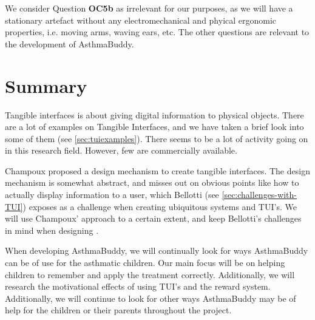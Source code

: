 We consider Question \textbf{OC5b} as irrelevant for our purposes, as we will have a stationary artefact without any electromechanical and phyical ergonomic properties, i.e. moving arms, waving ears, etc. The other questions are relevant to the development of AsthmaBuddy.



\section{Summary}
\label{sec:tangiblesummary}


Tangible interfaces is about giving digital information to physical objects. There are a lot of examples on Tangible Interfaces, and we have taken a brief look into some of them (see \ref{sec:tuiexamples}). There seems to be a lot of activity going on in this research field. However, few are commercially available. 


Champoux proposed a design mechanism to create tangible interfaces. The design mechanism is somewhat abstract, and misses out on obvious points like how to actually display information to a user, which Bellotti \etal{} (see \ref{sec:challenges-with-TUI}) exposes as a challenge when creating ubiquitous systems and TUI's. We will use Champoux' approach to a certain extent, and keep Bellotti's challenges in mind when designing \buddy{}.   

When developing AsthmaBuddy, we will continually look for ways AsthmaBuddy can be of use for the asthmatic children. Our main focus will be on helping children to remember and apply the treatment correctly. Additionally, we will research the motivational effects of using TUI's and the reward system. Additionally, we will continue to look for other ways AsthmaBuddy may be of help for the children or their parents throughout the project.  

 